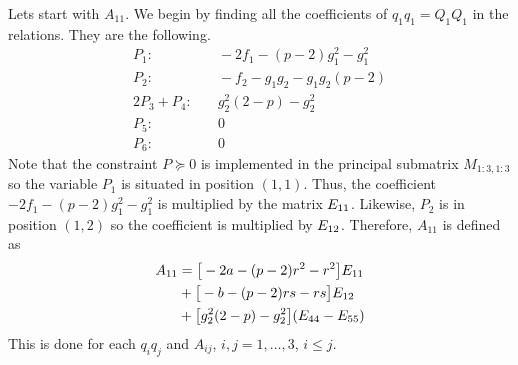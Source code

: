 \documentclass[a4paper,12pt,twoside,BCOR=10mm]{scrbook}
\begin{document}
Lets start with $A_{11}$. We begin by finding all the coefficients of $q_1q_1 = Q_1Q_1$ in the relations. They are the following.
\begin{align*}
    P_1:& \quad -2f_1 - (p - 2)g_1^2 - g_1^2\\
    P_2:& \quad -f_2 - g_1g_2 - g_1g_2(p - 2)\\
    2P_3 + P_4:& \quad g_2^2(2 - p) - g_2^2\\
    P_5:& \quad 0\\
    P_6:& \quad 0
\end{align*}
Note that the constraint $P \succeq 0$ is implemented in the principal submatrix $M_{1:3,1:3}$ so the variable $P_1$ is situated in position $(1,1)$. Thus, the coefficient $-2f_1 - (p - 2)g_1^2 - g_1^2$ is multiplied by the matrix $E_{11}$. Likewise, $P_2$ is in position $(1,2)$ so the coefficient is multiplied by $E_{12}$. Therefore, $A_{11}$ is defined as
\begin{align*}
    A_{11} &= \big[-2a - (p - 2)r^2 - r^2\big]E_{11}\\
    \quad& + \big[-b - (p - 2)rs - rs\big]E_{12}\\
    \quad& + \big[g_2^2(2 - p) - g_2^2\big](E_{44} - E_{55})
\end{align*}
This is done for each $q_iq_j$ and $A_{ij}$, $i,j = 1,\ldots,3$, $i \leq j$.
\end{document}
